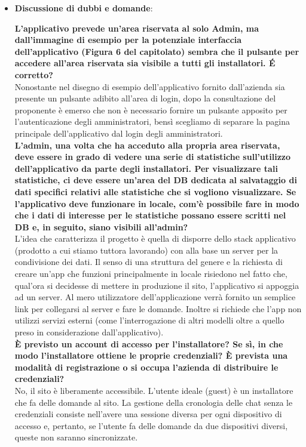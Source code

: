 \begin{itemize}
      \item \textbf{Discussione di dubbi e domande}:

      \textbf{L'applicativo prevede un'area riservata al solo Admin, ma dall'immagine di esempio per la potenziale interfaccia dell'applicativo (Figura 6 del capitolato) sembra che il pulsante per accedere all'area riservata sia visibile a tutti gli installatori. \'E corretto?}\\
      Nonostante nel disegno di esempio dell'applicativo fornito dall'azienda sia presente un pulsante adibito all'area di login, dopo la consultazione del proponente è emerso che non è necessario fornire un pulsante apposito per l'autenticazione degli amministratori, bensì scegliamo di separare la pagina principale dell'applicativo dal login degli amministratori.\\

      \textbf{L'admin, una volta che ha acceduto alla propria area riservata, deve essere in grado di vedere una serie di statistiche sull'utilizzo dell'applicativo da parte degli installatori. Per visualizzare tali statistiche, ci deve essere un'area del DB dedicata al salvataggio di dati specifici relativi alle statistiche che si vogliono visualizzare. Se l'applicativo deve funzionare in locale, com'è possibile fare in modo che i dati di interesse per le statistiche possano essere scritti nel DB e, in seguito, siano visibili all'admin?}\\
      L'idea che caratterizza il progetto è quella di disporre dello stack applicativo (prodotto a cui stiamo tuttora lavorando) con alla base un server per la condivisione dei dati. Il senso di una struttura del genere e la richiesta di creare un'app che funzioni principalmente in locale risiedono nel fatto che, qual'ora si decidesse di mettere in produzione il sito, l'applicativo si appoggia ad un server. Al mero utilizzatore dell'applicazione verrà fornito un semplice link per collegarsi al server e fare le domande. Inoltre si richiede che l'app non utilizzi servizi esterni (come l'interrogazione di altri modelli oltre a quello preso in considerazione dall'applicativo).\\

      \textbf{È previsto un account di accesso per l'installatore? Se sì, in che modo l'installatore ottiene le proprie credenziali? È prevista una modalità di registrazione o si occupa l'azienda di distribuire le credenziali?}\\
      No, il sito è liberamente accessibile. L'utente ideale (guest) è un installatore che fa delle domande al sito. La gestione della cronologia delle chat senza le credenziali consiste nell'avere una sessione diversa per ogni dispositivo di accesso e, pertanto, se l'utente fa delle domande da due dispositivi diversi, queste non saranno sincronizzate.\\


\end{itemize}
